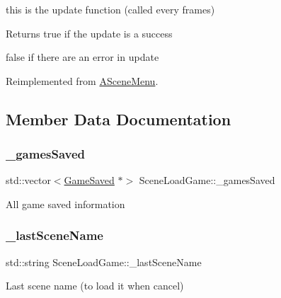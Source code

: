 this is the update function (called every frames) 

\begin{DoxyReturn}{Returns}
true if the update is a success 

false if there are an error in update 
\end{DoxyReturn}


Reimplemented from \hyperlink{class_a_scene_menu_a1deeb5fd9be97376998cd2af36f29744}{A\+Scene\+Menu}.



\subsection{Member Data Documentation}
\mbox{\label{class_scene_load_game_ad5bf77c59b06d6c3b24a62a591667b1e}} 
\subsubsection{\texorpdfstring{\+\_\+games\+Saved}{\_gamesSaved}}
{\footnotesize\ttfamily std\+::vector$<$\hyperlink{struct_scene_load_game_1_1_game_saved}{Game\+Saved} $\ast$$>$ Scene\+Load\+Game\+::\+\_\+games\+Saved\hspace{0.3cm}{\ttfamily [protected]}}

All game saved information \mbox{\label{class_scene_load_game_a4615279dd03f5533862a57b54f251970}} 
\subsubsection{\texorpdfstring{\+\_\+last\+Scene\+Name}{\_lastSceneName}}
{\footnotesize\ttfamily std\+::string Scene\+Load\+Game\+::\+\_\+last\+Scene\+Name\hspace{0.3cm}{\ttfamily [protected]}}

Last scene name (to load it when cancel) \mbox{\label{class_scene_load_game_aa07779d67adf894e656b24ada2385aa9}} 
